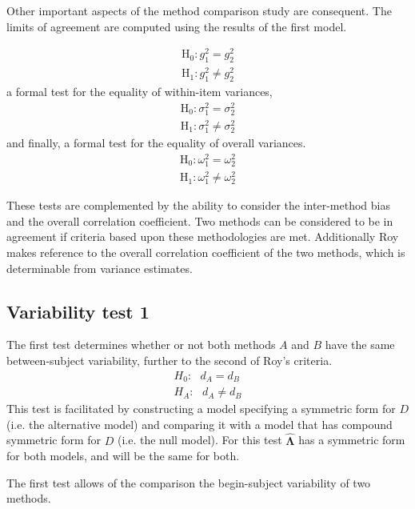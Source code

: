 \documentclass[12pt, a4paper]{report}
\theoremstyle{plain}
\theoremstyle{definition}
\theoremstyle{remark}
\begin{document}
	Other important aspects of the method comparison study are consequent. The limits of agreement are computed using the results of the first model.
	
	
	\begin{eqnarray*}
		\operatorname{H_0} : g^2_1 = g^2_2 \\
		\operatorname{H_1} : g^2_1 \neq g^2_2
	\end{eqnarray*}
	a formal test for the equality of within-item variances,
	\begin{eqnarray*}
		\operatorname{H_0} : \sigma^2_1 = \sigma^2_2 \\
		\operatorname{H_1} : \sigma^2_1 \neq \sigma^2_2
	\end{eqnarray*}
	and finally, a formal test for the equality of overall variances.
	\begin{eqnarray*}
		\operatorname{H_0} : \omega^2_1 = \omega^2_2 \\
		\operatorname{H_1} : \omega^2_1 \neq \omega^2_2
	\end{eqnarray*}

	
	These tests are complemented by the ability to consider the inter-method bias and the overall correlation coefficient.
	Two methods can be considered to be in agreement if criteria based upon these methodologies are met. Additionally Roy makes reference to the overall correlation coefficient of the two methods, which is determinable from variance estimates.




	
	
	\subsection{Variability test 1}
	The first test determines whether or not both methods $A$ and $B$ have the same between-subject variability, further to the second of Roy's criteria.
	\begin{eqnarray*}
		H_{0}: \mbox{ }d_{A}  = d_{B} \\
		H_{A}: \mbox{ }d_{A}  \neq d_{B}
	\end{eqnarray*}
	This test is facilitated by constructing a model specifying a symmetric form for $D$ (i.e. the alternative model) and comparing it with a model that has compound symmetric form for $D$ (i.e. the null model). For this test $\boldsymbol{\hat{\Lambda}}$ has a symmetric form for both models, and will be the same for both.
	
	The first test allows of the comparison the begin-subject variability of two methods. 
\end{document}
